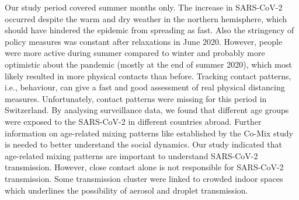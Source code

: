 \documentclass[10pt, a4paper, twoside]{article}
\begin{document}
\begin{multicols}{2}
Our study period covered summer months only.
The increase in SARS-CoV-2 occurred despite the warm and dry weather in the northern hemisphere, which should have hindered the epidemic from spreading as fast.\cite{neher_potential_2020} 
Also the stringency of policy measures was constant after relaxations in June 2020.
However, people were more active during summer compared to winter and probably more optimistic about the pandemic (mostly at the end of summer 2020), which most likely resulted in more physical contacts than before.
Tracking contact patterns, i.e., behaviour, can give a fast and good assessment of real physical distancing measures.\cite{jarvis_quantifying_2020}
Unfortunately, contact patterns were missing for this period in Switzerland.
By analysing surveillance data, we found that different age groups were exposed to the SARS-CoV-2 in different countries abroad.
Further information on age-related mixing patterns like established by the Co-Mix study is needed to better understand the social dynamics.\cite{coletti_comix_2020}
Our study indicated that age-related mixing patterns are important to understand SARS-CoV-2 transmission.
However, close contact alone is not responsible for SARS-CoV-2 transmission.
Some transmission cluster were linked to crowded indoor spaces which underlines the possibility of aerosol and droplet transmission.\cite{tang_aerosol_2020}


\end{multicols}
\end{document}
